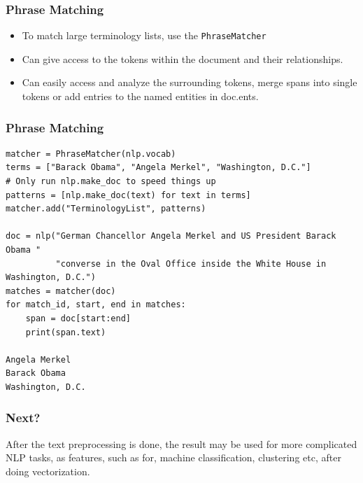 \begin{frame}[fragile]\frametitle{Phrase Matching }

  \begin{itemize}
    \item To match large terminology lists, use the \lstinline|PhraseMatcher|
		\item Can give access to the tokens within the document and their relationships.
		\item Can easily access and analyze the surrounding tokens, merge spans into single tokens or add entries to the named entities in doc.ents.
  \end{itemize}
	
\end{frame}

\begin{frame}[fragile]\frametitle{Phrase Matching }

\begin{lstlisting}
matcher = PhraseMatcher(nlp.vocab)
terms = ["Barack Obama", "Angela Merkel", "Washington, D.C."]
# Only run nlp.make_doc to speed things up
patterns = [nlp.make_doc(text) for text in terms]
matcher.add("TerminologyList", patterns)

doc = nlp("German Chancellor Angela Merkel and US President Barack Obama "
          "converse in the Oval Office inside the White House in Washington, D.C.")
matches = matcher(doc)
for match_id, start, end in matches:
    span = doc[start:end]
    print(span.text)
		
Angela Merkel
Barack Obama
Washington, D.C.
\end{lstlisting}


\end{frame}


\begin{frame}[fragile]
\frametitle{Next?}
 After the text preprocessing is done, the result may be used for more complicated NLP tasks, as features, such as for, machine classification, clustering etc, after doing vectorization.
\end{frame}